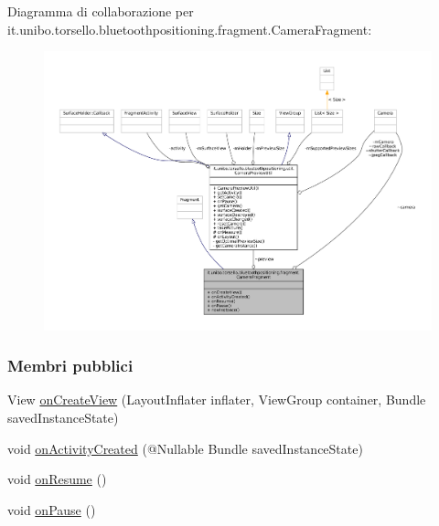 Diagramma di collaborazione per it.\+unibo.\+torsello.\+bluetoothpositioning.\+fragment.\+Camera\+Fragment\+:
\nopagebreak
\begin{figure}[H]
\begin{center}
\leavevmode
\includegraphics[width=350pt]{classit_1_1unibo_1_1torsello_1_1bluetoothpositioning_1_1fragment_1_1CameraFragment__coll__graph}
\end{center}
\end{figure}
\subsubsection*{Membri pubblici}
\begin{DoxyCompactItemize}
\item 
View \hyperlink{classit_1_1unibo_1_1torsello_1_1bluetoothpositioning_1_1fragment_1_1CameraFragment_a3a80f360922bd6a8c749cda2a09c64cf_a3a80f360922bd6a8c749cda2a09c64cf}{on\+Create\+View} (Layout\+Inflater inflater, View\+Group container, Bundle saved\+Instance\+State)
\item 
void \hyperlink{classit_1_1unibo_1_1torsello_1_1bluetoothpositioning_1_1fragment_1_1CameraFragment_a3af6cb206d2194e7d580cf511a97d6f1_a3af6cb206d2194e7d580cf511a97d6f1}{on\+Activity\+Created} (@Nullable Bundle saved\+Instance\+State)
\item 
void \hyperlink{classit_1_1unibo_1_1torsello_1_1bluetoothpositioning_1_1fragment_1_1CameraFragment_a8981ef6a92682639b28336a018bf1475_a8981ef6a92682639b28336a018bf1475}{on\+Resume} ()
\item 
void \hyperlink{classit_1_1unibo_1_1torsello_1_1bluetoothpositioning_1_1fragment_1_1CameraFragment_a3fb58eb9f1f5a3e516b9b21aa3e1e43d_a3fb58eb9f1f5a3e516b9b21aa3e1e43d}{on\+Pause} ()
\end{DoxyCompactItemize}
